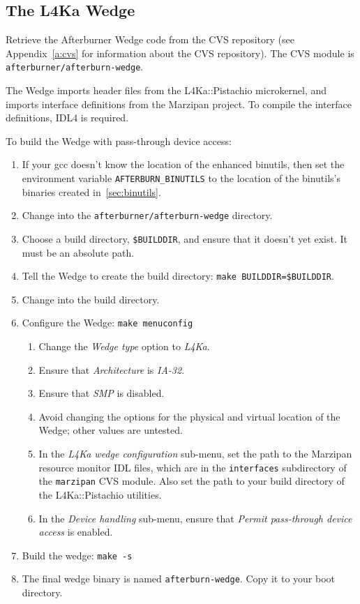 \documentclass[twoside,a4paper]{report}
\newcommand{\code}[1]{{\tt #1}}
\newcommand{\cmd}[1]{\code{#1}}
\newcommand{\Pistachio}{L4Ka::Pistachio}
\newcommand{\IDL}{IDL4}
\begin{document}
\subsection{The L4Ka Wedge}

Retrieve the Afterburner Wedge code from the CVS repository (see
Appendix~\ref{a:cvs} for information about the CVS repository).  The
CVS module is \code{afterburner/afterburn-wedge}.

The Wedge imports header files from the \Pistachio{} microkernel, and
imports interface definitions from the Marzipan project.  To compile
the interface definitions, \IDL{} is required.

To build the Wedge with pass-through device access:
\begin{enumerate}
\item If your gcc doesn't know the location of the enhanced binutils,
then set the environment variable \code{AFTERBURN\_BINUTILS} to the
location of the binutils's binaries created in~\ref{sec:binutils}.
\item Change into the \code{afterburner/afterburn-wedge} directory.
\item Choose a build directory, \code{\$BUILDDIR}, and ensure that it
doesn't yet exist.  It must be an absolute path.
\item Tell the Wedge to create the build directory: 
\cmd{make BUILDDIR=\$BUILDDIR}.
\item Change into the build directory.
\item Configure the Wedge: \cmd{make menuconfig}
  \begin{enumerate}
  \item Change the \emph{Wedge type} option to \emph{L4Ka}.
  \item Ensure that \emph{Architecture} is \emph{IA-32}.
  \item Ensure that \emph{SMP} is disabled.
  \item Avoid changing the options for the physical and virtual
  location of the Wedge; other values are untested.
  \item In the \emph{L4Ka wedge configuration} sub-menu, set the path
  to the Marzipan resource monitor IDL files, which are in the
  \code{interfaces} subdirectory of the \code{marzipan} CVS module.
  Also set the path to your build directory of the \Pistachio{}
  utilities.
  \item In the \emph{Device handling} sub-menu, ensure that
  \emph{Permit pass-through device access} is enabled.
  \end{enumerate}
\item Build the wedge: \cmd{make -s}
\item The final wedge binary is named \code{afterburn-wedge}.  Copy it
to your boot directory.
\end{enumerate}
\end{document}
